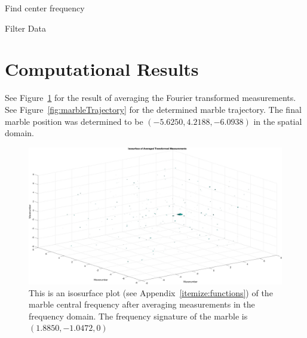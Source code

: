 \documentclass{article}
\begin{document}
\begin{algorithm}
\begin{algorithmic}
    \ENDFOR
    
\end{algorithmic}
\caption{Find center frequency}
\label{alg:Marble Frequency}
\end{algorithm}

\begin{algorithm}
\begin{algorithmic}
    \ENDFOR
\end{algorithmic}
\caption{Filter Data}
\label{alg:Filter Data}
\end{algorithm}

\section{Computational Results}
See Figure~\ref{fig:marbleSignal} for the result of averaging the Fourier transformed measurements. See Figure~\ref{fig:marbleTrajectory} for the determined marble trajectory. The final marble position was determined to be $(-5.6250,       4.2188,   -6.0938)$ in the spatial domain.

\begin{figure}
    \centering
    \includegraphics[width=1.0\linewidth]{marbleSignal.jpg}
    \caption{This is an isosurface plot (see Appendix~\ref{itemize:functions}) of the marble central frequency after averaging measurements in the frequency domain. The frequency signature of the marble is $(1.8850, -1.0472, 0)$}
    \label{fig:marbleSignal}
\end{figure}
\end{document}
